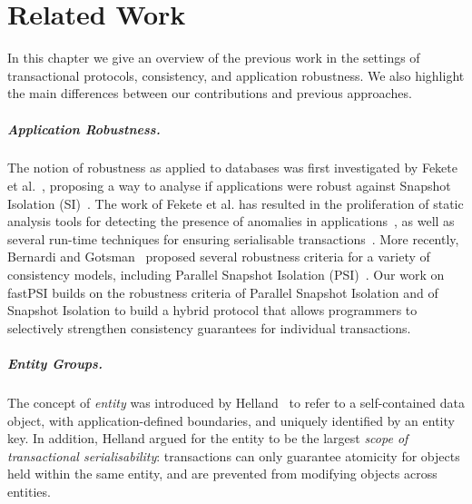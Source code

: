 \cleardoublepage
\chapter{Related Work}
\label{chapter:related_work}

In this chapter we give an overview of the previous work in the settings of transactional protocols, consistency, and application robustness. We also highlight the main differences between our contributions and previous approaches.


\paragraph{Application Robustness.} The notion of robustness as applied to databases was first investigated by Fekete et al.~\citep{fekete_ssi}, proposing a way to analyse if applications were robust against Snapshot Isolation (SI)~\citep{sql-critique}. The work of Fekete et al. has resulted in the proliferation of static analysis tools for detecting the presence of anomalies in applications~\citep{sudhir_static}, as well as several run-time techniques for ensuring serialisable transactions~\citep{ports_postgres}. More recently, Bernardi and Gotsman~\citep{concur_robustness} proposed several robustness criteria for a variety of consistency models, including Parallel Snapshot Isolation (PSI)~\citep{psi-intro}. Our work on fastPSI builds on the robustness criteria of Parallel Snapshot Isolation and of Snapshot Isolation to build a hybrid protocol that allows programmers to selectively strengthen consistency guarantees for individual transactions.


\paragraph{Entity Groups.} The concept of \emph{entity} was introduced by Helland~\citep{helland_entity} to refer to a self-contained data object, with application-defined boundaries, and uniquely identified by an entity key. In addition, Helland argued for the entity to be the largest \emph{scope of transactional serialisability}: transactions can only guarantee atomicity for objects held within the same entity, and are prevented from modifying objects across entities.

